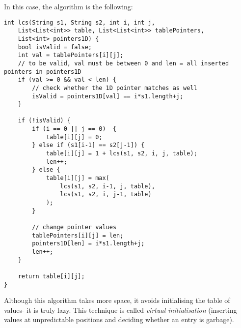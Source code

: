 \documentclass[a4paper, openany]{memoir}
\begin{document}
    In this case, the algorithm is the following:
\begin{lstlisting}[language=pseudocode]
int lcs(String s1, String s2, int i, int j,
    List<List<int>> table, List<List<int>> tablePointers, 
    List<int> pointers1D) {
    bool isValid = false;
    int val = tablePointers[i][j];
    // to be valid, val must be between 0 and len = all inserted pointers in pointers1D
    if (val >= 0 && val < len) {
        // check whether the 1D pointer matches as well
        isValid = pointers1D[val] == i*s1.length+j;
    }

    if (!isValid) {
        if (i == 0 || j == 0)  {
            table[i][j] = 0;
        } else if (s1[i-1] == s2[j-1]) {
            table[i][j] = 1 + lcs(s1, s2, i, j, table);
            len++;
        } else {
            table[i][j] = max(
                lcs(s1, s2, i-1, j, table), 
                lcs(s1, s2, i, j-1, table)
            );
        }

        // change pointer values
        tablePointers[i][j] = len;
        pointers1D[len] = i*s1.length+j;
        len++;
    }

    return table[i][j];
}
\end{lstlisting}
    Although this algorithm takes more space, it avoids initialising the table of values- it is truly lazy. This technique is called \emph{virtual initialisation} (inserting values at unpredictable positions and deciding whether an entry is garbage).
\end{document}
